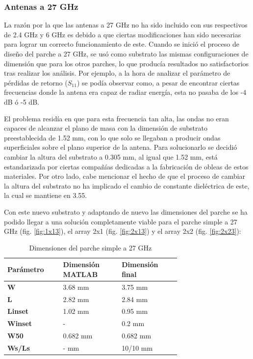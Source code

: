 \subsubsection{Antenas a 27 GHz}
\par La razón por la que las antenas a 27 GHz no ha sido incluido con sus respectivos de 2.4 GHz y 6 GHz es debido a que ciertas modificaciones han sido necesarias para lograr un correcto funcionamiento de este. Cuando se inició el proceso de diseño del parche a 27 GHz, se usó como substrato las mismas configuraciones de dimensión que para los otros parches, lo que producía resultados no satisfactorios tras realizar los análisis. Por ejemplo, a la hora de analizar el parámetro de pérdidas de retorno ($S_{11}$) se podía observar como, a pesar de encontrar ciertas frecuencias donde la antena era capaz de radiar energía, esta no pasaba de los -4 dB ó -5 dB. 
\\
\par El problema residía en que para esta frecuencia tan alta, las ondas no eran capaces de alcanzar el plano de masa con la dimensión de substrato preestablecida de 1.52 mm, con lo que solo se llegaban a producir ondas superficiales sobre el plano superior de la antena. Para solucionarlo se decidió cambiar la altura del substrato a 0.305 mm, al igual que 1.52 mm, está estandarizada por ciertas compañías dedicadas a la fabricación de obleas de estos materiales. Por otro lado, cabe mencionar el hecho de que el proceso de cambiar la altura del substrato no ha implicado el cambio de constante dieléctrica de este, la cual se mantiene en 3.55.
\\
\par Con este nuevo substrato y adaptando de nuevo las dimensiones del parche se ha podido llegar a una solución completamente viable para el parche simple a 27 GHz (fig. \ref{fig:1x13}), el array 2x1 (fig. \ref{fig:2x13}) y el array 2x2 (fig. \ref{fig:2x23}):

\begin{table}[H]
  
   \small %
   \centering %
   \begin{tabular}{m{0.2\linewidth}m{0.25\linewidth}m{0.25\linewidth}} %
   \toprule[\heavyrulewidth]\toprule[\heavyrulewidth]
   \textbf{Parámetro} & \textbf{Dimensión MATLAB} & \textbf{Dimensión final} \\ 
   \midrule
   \textbf{W} & 3.68 mm & 3.75 mm \\
   \textbf{L} & 2.82 mm & 2.84 mm\\
   \textbf{Linset} & 1.02 mm & 0.95 mm\\
   \textbf{Winset} & - & 0.2 mm\\
   \textbf{W50} & 0.682 mm & 0.682 mm\\
   \textbf{Ws/Ls} & - mm & 10/10 mm\\
   \bottomrule[\heavyrulewidth] 
   \end{tabular}
   \caption{Dimensiones del parche simple a 27 GHz} 
      \label{tab:1x13}
\end{table}


